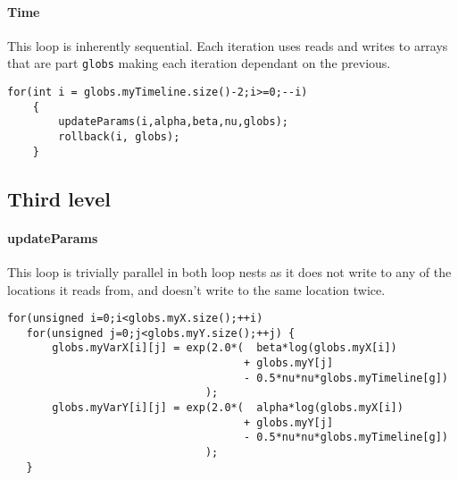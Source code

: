 \paragraph{Time}
This loop is inherently sequential. Each iteration uses reads and writes to arrays that are part \verb!globs! making
 each iteration dependant on the previous.
\begin{lstlisting}[caption=Timeline loop, label=timeloop]
for(int i = globs.myTimeline.size()-2;i>=0;--i)
    {
        updateParams(i,alpha,beta,nu,globs);
        rollback(i, globs);
    }
\end{lstlisting}

\subsection{Third level}
\label{sec:third}

\paragraph{updateParams}
This loop is trivially parallel in both loop nests as it does not write to any of the locations it reads from, and
 doesn't write to the same location twice.
\begin{lstlisting}[caption=Loop in updateParams(), label=updpar]
for(unsigned i=0;i<globs.myX.size();++i)
   for(unsigned j=0;j<globs.myY.size();++j) {
       globs.myVarX[i][j] = exp(2.0*(  beta*log(globs.myX[i])
                                     + globs.myY[j]
                                     - 0.5*nu*nu*globs.myTimeline[g])
                               );
       globs.myVarY[i][j] = exp(2.0*(  alpha*log(globs.myX[i])
                                     + globs.myY[j]
                                     - 0.5*nu*nu*globs.myTimeline[g])
                               );
   }
\end{lstlisting}

